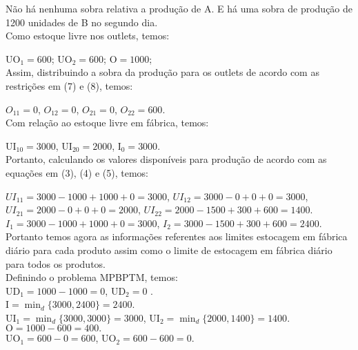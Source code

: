 \documentclass[authoryear,preprint,12pt]{elsarticle}
\begin{document}
Não há nenhuma sobra relativa a produção de A. E há uma sobra de produção de 1200 unidades de B no segundo dia. \\

Como estoque livre nos outlets, temos:

$\textrm{UO}_{1} = 600$;
$\textrm{UO}_{2} = 600$;
$\textrm{O} = 1000$; \\

Assim, distribuindo a sobra da produção para os outlets de acordo com as restrições em (7) e (8), temos:

$O_{11} = 0$,
$O_{12} = 0$,
$O_{21} = 0$,
$O_{22} = 600$. \\

Com relação ao estoque livre em fábrica, temos:

$\textrm{UI}_{10} = 3000$,
$\textrm{UI}_{20} = 2000$,
$\textrm{I}_{0} = 3000$. \\

Portanto, calculando os valores disponíveis para produção de acordo com as equações em (3), (4) e (5), temos:

$UI_{11} = 3000 - 1000 + 1000 + 0 =  3000$,
$UI_{12} = 3000 - 0 + 0 + 0 =  3000$,
$UI_{21} = 2000 - 0 + 0 + 0 =  2000$,
$UI_{22} = 2000 - 1500 + 300 + 600 =  1400$. \\

$I_{1} = 3000 - 1000 + 1000 + 0 = 3000$,
$I_{2} = 3000 - 1500 + 300 + 600 = 2400$. \\

Portanto temos agora as informações referentes aos limites estocagem em fábrica diário para cada produto assim como o limite de estocagem em fábrica diário para todos os produtos. \\

Definindo o problema MPBPTM, temos: \\

$\textrm{UD}_{1} = 1000 - 1000 = 0$,
$\textrm{UD}_{2} = 0$ . \\

$\textrm{I} = \min_{d} \{3000, 2400\} = 2400$. \\

$ \textrm{UI}_{1} = \min_{d} \{3000, 3000\} = 3000 $,
$ \textrm{UI}_{2} = \min_{d} \{2000, 1400\} = 1400 $. \\

$\textrm{O} = 1000 - 600 = 400.$ \\

$\textrm{UO}_{1} = 600 - 0 = 600$, 
$\textrm{UO}_{2} = 600 - 600 = 0$. \\
\end{document}
